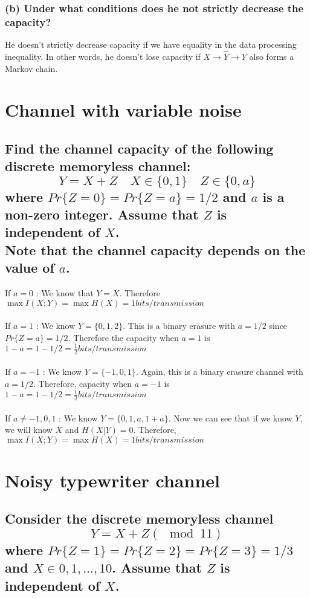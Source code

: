 \documentclass[11pt, oneside]{book}   	%
\begin{document}
\subsubsection{(b) Under what conditions does he not strictly decrease the capacity?}
He doesn't strictly decrease capacity if we have equality in the data processing inequality.  In other words, he doesn't lose capacity if $X \rightarrow \hat{Y} \rightarrow Y$ also forms a Markov chain.

\section{Channel with variable noise}
\subsection*{Find the channel capacity of the following discrete memoryless channel:
$$ Y=X+Z \quad X \in \{0,1\} \quad Z \in \{0,a\} $$
where $Pr\{Z=0\}=Pr\{Z=a\}=1/2$ and $a$ is a non-zero integer.  Assume that $Z$ is independent of $X$.\\Note that the channel capacity depends on the value of $a$.}
If $a = 0$ : We know that $Y = X$.  Therefore $\max I(X;Y)=\max H(X) = 1 bits/transmission$\\\\
If $a = 1$ : We know $Y=\{0,1,2\}$.  This is a binary erasure with $a=1/2$ since $Pr\{Z=a\}=1/2$.  Therefore the capacity when $a = 1$ is $1-a = 1-1/2 = \frac{1}{2} bits/transmission$\\\\
If $a=-1$ : We know $Y=\{-1,0,1\}$.  Again, this is a binary erasure channel with $a=1/2$.  Therefore, capacity when $a=-1$ is $1-a=1-1/2=\frac{1}{2}bits/transmission$\\\\
If $a \neq -1,0,1$ : We know $Y=\{0, 1, a, 1+a\}$.  Now we can see that if we know $Y$, we will know $X$ and $H(X|Y)=0$.  Therefore, $\max I(X;Y)=\max H(X) = 1bits/transmission$

\section{Noisy typewriter channel}
\subsection*{Consider the discrete memoryless channel
$$Y=X+Z(\mod{11})$$
where $Pr\{Z=1\}=Pr\{Z=2\}=Pr\{Z=3\}=1/3$ and $X \in {0,1,...,10}$.  Assume that $Z$ is independent of $X$.}
\end{document}
